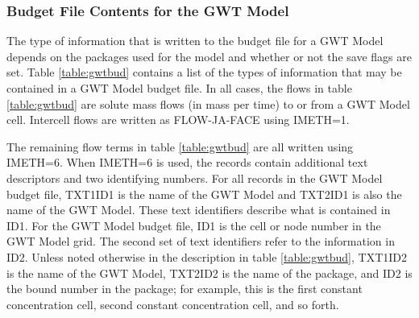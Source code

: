 \newpage
\subsubsection{Budget File Contents for the GWT Model}

The type of information that is written to the budget file for a GWT Model depends on the packages used for the model and whether or not the save flags are set.  Table \ref{table:gwtbud} contains a list of the types of information that may be contained in a GWT Model budget file.  In all cases, the flows in table \ref{table:gwtbud} are solute mass flows (in mass per time) to or from a GWT Model cell.  Intercell flows are written as FLOW-JA-FACE using IMETH=1.

The remaining flow terms in table \ref{table:gwtbud} are all written using IMETH=6.  When IMETH=6 is used, the records contain additional text descriptors and two identifying numbers.  For all records in the GWT Model budget file, TXT1ID1 is the name of the GWT Model and TXT2ID1 is also the name of the GWT Model.  These text identifiers describe what is contained in ID1.  For the GWT Model budget file, ID1 is the cell or node number in the GWT Model grid.  The second set of text identifiers refer to the information in ID2.  Unless noted otherwise in the description in table \ref{table:gwtbud}, TXT1ID2 is the name of the GWT Model, TXT2ID2 is the name of the package, and ID2 is the bound number in the package; for example, this is the first constant concentration cell, second constant concentration cell, and so forth.  

